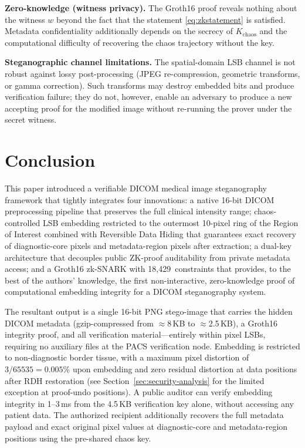 \documentclass{jstarticle}
\begin{document}
\textbf{Zero-knowledge (witness privacy).}
The Groth16 proof reveals nothing about the witness $w$ beyond the fact that the statement \eqref{eq:zkstatement} is satisfied.
Metadata confidentiality additionally depends on the secrecy of $K_{\text{chaos}}$ and the computational difficulty of recovering the chaos trajectory without the key.

\textbf{Steganographic channel limitations.}
The spatial-domain LSB channel is not robust against lossy post-processing (JPEG re-compression, geometric transforms, or gamma correction).
Such transforms may destroy embedded bits and produce verification failure; they do not, however, enable an adversary to produce a new accepting proof for the modified image without re-running the prover under the secret witness.

\section{Conclusion}
\label{sec:conclusion}

This paper introduced a verifiable DICOM medical image steganography framework that tightly integrates four innovations: a native 16-bit DICOM preprocessing pipeline that preserves the full clinical intensity range; chaos-controlled LSB embedding restricted to the outermost 10-pixel ring of the Region of Interest combined with Reversible Data Hiding that guarantees exact recovery of diagnostic-core pixels and metadata-region pixels after extraction; a dual-key architecture that decouples public ZK-proof auditability from private metadata access; and a Groth16 zk-SNARK with 18,429~constraints that provides, to the best of the authors' knowledge, the first non-interactive, zero-knowledge proof of computational embedding integrity for a DICOM steganography system.

The resultant output is a single 16-bit PNG stego-image that carries the hidden DICOM metadata (gzip-compressed from $\approx$8\,KB to $\approx$2.5\,KB), a Groth16 integrity proof, and all verification material---entirely within pixel LSBs, requiring no auxiliary files at the PACS verification node.
Embedding is restricted to non-diagnostic border tissue, with a maximum pixel distortion of $3/65535 = 0.005\%$ upon embedding and zero residual distortion at data positions after RDH restoration (see Section~\ref{sec:security-analysis} for the limited exception at proof-undo positions).
A public auditor can verify embedding integrity in 1--3\,ms from the 4.5\,KB verification key alone, without accessing any patient data.
The authorized recipient additionally recovers the full metadata payload and exact original pixel values at diagnostic-core and metadata-region positions using the pre-shared chaos key.
\end{document}
